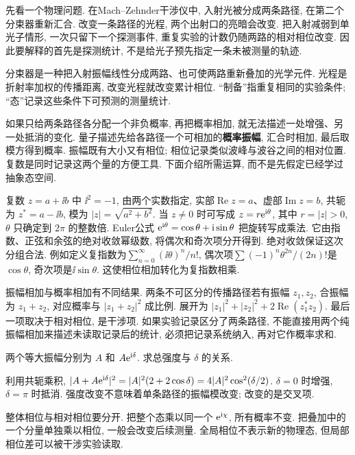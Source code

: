 \label{ch:waves}
先看一个物理问题. 在Mach--Zehnder干涉仪中, 入射光被分成两条路径, 在第二个分束器重新汇合. 改变一条路径的光程, 两个出射口的亮暗会改变. 把入射减弱到单光子情形, 一次只留下一个探测事件, 重复实验的计数仍随两路的相对相位改变. 因此要解释的首先是探测统计, 不是给光子预先指定一条未被测量的轨迹.

分束器是一种把入射振幅线性分成两路、也可使两路重新叠加的光学元件. 光程是折射率加权的传播距离, 改变光程就改变累计相位. “制备”指重复相同的实验条件; “态”记录这些条件下可预测的测量统计.

如果只给两条路径各分配一个非负概率, 再把概率相加, 就无法描述一处增强、另一处抵消的变化. 量子描述先给各路径一个可相加的\textbf{概率振幅}, 汇合时相加, 最后取模方得到概率. 振幅既有大小又有相位; 相位记录类似波峰与波谷之间的相对位置. 复数是同时记录这两个量的方便工具. 下面介绍所需运算, 而不是先假定已经学过抽象态空间.

复数 $z=a+\ii b$ 中 $\ii^2=-1$, 由两个实数指定, 实部$\operatorname{Re}z=a$、虚部$\operatorname{Im}z=b$, 共轭为 $z^*=a-\ii b$, 模为 $|z|=\sqrt{a^2+b^2}$. 当 $z\ne0$ 时可写成 $z=r\mathrm e^{\mathrm i\theta}$, 其中 $r=|z|>0$, $\theta$ 只确定到 $2\pi$ 的整数倍. Euler公式 $\mathrm e^{\mathrm i\theta}=\cos\theta+\mathrm i\sin\theta$ 把旋转写成乘法. 它由指数、正弦和余弦的绝对收敛幂级数, 将偶次和奇次项分开得到. 绝对收敛保证这次分组合法. 例如定义复指数为$\sum_{n=0}^\infty(\ii\theta)^n/n!$, 偶次项$\sum(-1)^n\theta^{2n}/(2n)!$是$\cos\theta$, 奇次项是$\ii\sin\theta$. 这使相位相加转化为复指数相乘.

振幅相加与概率相加有不同结果. 两条不可区分的传播路径若有振幅 $z_1,z_2$, 合振幅为 $z_1+z_2$, 对应概率与 $|z_1+z_2|^2$ 成比例. 展开为 $|z_1|^2+|z_2|^2+2\operatorname{Re}(z_1^*z_2)$. 最后一项取决于相对相位, 是干涉项. 如果实验记录区分了两条路径, 不能直接用两个纯振幅相加来描述未读取记录后的统计, 必须把记录系统纳入, 再对它作概率求和.

\begin{example}
两个等大振幅分别为 $A$ 和 $A\mathrm e^{\mathrm i\delta}$. 求总强度与 $\delta$ 的关系.
\end{example}
\begin{solution}
利用共轭乘积, $|A+A\mathrm e^{\mathrm i\delta}|^2=|A|^2(2+2\cos\delta)=4|A|^2\cos^2(\delta/2)$. $\delta=0$ 时增强, $\delta=\pi$ 时抵消. 强度改变不意味着单条路径的振幅模改变; 改变的是交叉项.
\end{solution}

整体相位与相对相位要分开. 把整个态乘以同一个 $\mathrm e^{\mathrm i\chi}$, 所有概率不变. 把叠加中的一个分量单独乘以相位, 一般会改变后续测量. 全局相位不表示新的物理态, 但局部相位差可以被干涉实验读取.

